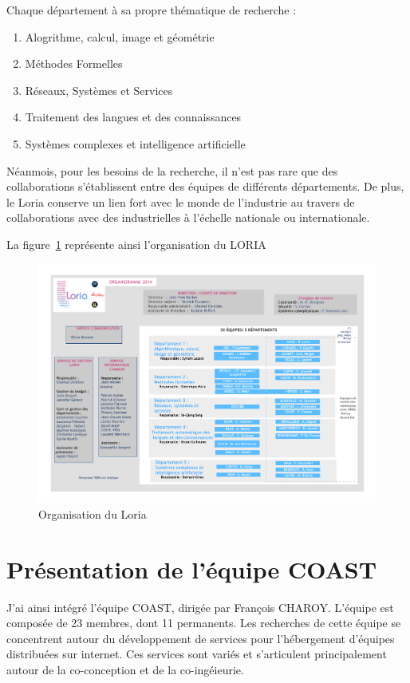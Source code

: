 \documentclass{tnreport}
\begin{document}
Chaque département à sa propre thématique de recherche :

\begin{enumerate}
  \item Alogrithme, calcul, image et géométrie
  \item Méthodes Formelles
  \item Réseaux, Systèmes et Services
  \item Traitement des langues et des connaissances
  \item Systèmes complexes et intelligence artificielle
\end{enumerate}

Néanmois, pour les besoins de la recherche, il n'est pas rare que des collaborations s'établissent entre des équipes de différents départements. De plus, le Loria conserve un lien fort avec le monde de l'industrie au travers de collaborations avec des industrielles à l'échelle nationale ou internationale.

La figure~\ref{fig:orga} représente ainsi l'organisation du LORIA 

\begin{figure}[h!]
  \centering
  \includegraphics[width=18cm]{figures/organization}
  \caption{Organisation du Loria}
  \label{fig:orga}
\end{figure}

\section{Présentation de l'équipe COAST} 

J'ai ainsi intégré l'équipe COAST, dirigée par François CHAROY. L'équipe est composée de 23 membres, dont 11 permanents. Les recherches de cette équipe se concentrent autour du développement de services pour l'hébergement d'équipes distribuées sur internet. Ces services sont variés et s'articulent principalement autour de la co-conception et de la co-ingéieurie.
\end{document}
